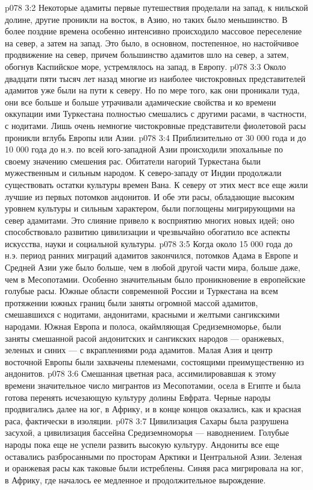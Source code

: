 \vs p078 3:2 Некоторые адамиты первые путешествия проделали на запад, к нильской долине, другие проникли на восток, в Азию, но таких было меньшинство. В более поздние времена особенно интенсивно происходило массовое переселение на север, а затем на запад. Это было, в основном, постепенное, но настойчивое продвижение на север, причем большинство адамитов шло на север, а затем, обогнув Каспийское море, устремлялось на запад, в Европу.
\vs p078 3:3 Около двадцати пяти тысяч лет назад многие из наиболее чистокровных представителей адамитов уже были на пути к северу. Но по мере того, как они проникали туда, они все больше и больше утрачивали адамические свойства и ко времени оккупации ими Туркестана полностью смешались с другими расами, в частности, с нодитами. Лишь очень немногие чистокровные представители фиолетовой расы проникли вглубь Европы или Азии.
\vs p078 3:4 Приблизительно от 30 000 года и до 10 000 года до н.э. по всей юго\hyp{}западной Азии происходили эпохальные по своему значению смешения рас. Обитатели нагорий Туркестана были мужественным и сильным народом. К северо\hyp{}западу от Индии продолжали существовать остатки культуры времен Вана. К северу от этих мест все еще жили лучшие из первых потомков андонитов. И обе эти расы, обладающие высоким уровнем культуры и сильным характером, были поглощены мигрирующими на север адамитами. Это слияние привело к восприятию многих новых идей; оно способствовало развитию цивилизации и чрезвычайно обогатило все аспекты искусства, науки и социальной культуры.
\vs p078 3:5 \pc Когда около 15 000 года до н.э. период ранних миграций адамитов закончился, потомков Адама в Европе и Средней Азии уже было больше, чем в любой другой части мира, больше даже, чем в Месопотамии. Особенно значительным было проникновение в европейские голубые расы. Южные области современной России и Туркестана на всем протяжении южных границ были заняты огромной массой адамитов, смешавшихся с нодитами, андонитами, красными и желтыми сангикскими народами. Южная Европа и полоса, окаймляющая Средиземноморье, были заняты смешанной расой андонитских и сангикских народов --- оранжевых, зеленых и синих --- с вкраплениями рода адамитов. Малая Азия и центр восточной Европы были захвачены племенами, состоящими преимущественно из андонитов.
\vs p078 3:6 Смешанная цветная раса, ассимилировавшая к этому времени значительное число мигрантов из Месопотамии, осела в Египте и была готова перенять исчезающую культуру долины Евфрата. Черные народы продвигались далее на юг, в Африку, и в конце концов оказались, как и красная раса, фактически в изоляции.
\vs p078 3:7 Цивилизация Сахары была разрушена засухой, а цивилизация бассейна Средиземноморья --- наводнением. Голубые народы пока еще не успели развить высокую культуру. Андониты все еще оставались разбросанными по просторам Арктики и Центральной Азии. Зеленая и оранжевая расы как таковые были истреблены. Синяя раса мигрировала на юг, в Африку, где началось ее медленное и продолжительное вырождение.
